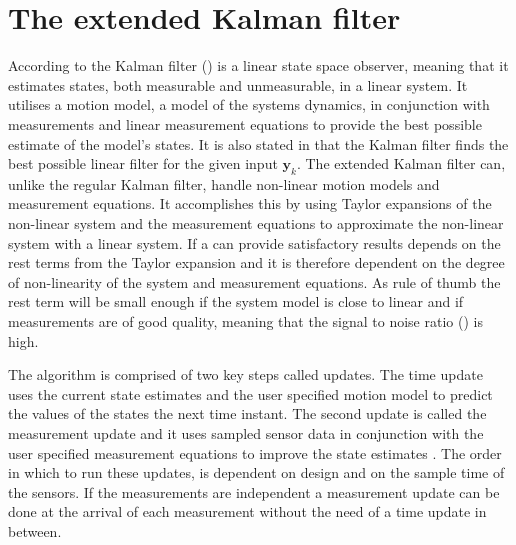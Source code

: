 \section{The extended Kalman filter}
According to \citet{sensorfusion} the Kalman filter (\abbrKF) is a linear state space observer, meaning that it estimates states, both measurable and unmeasurable, in a linear system. It utilises a motion model, a model of the systems dynamics, in conjunction with measurements and linear measurement equations to provide the best possible estimate of the model's states. It is also stated in \citet{sensorfusion} that the Kalman filter finds the best possible linear filter for the given input $\boldsymbol{y}_{k}$. The extended Kalman filter can, unlike the regular Kalman filter, handle non-linear motion models and measurement equations. It accomplishes this by using Taylor expansions of the non-linear system and the measurement equations to approximate the non-linear system with a linear system. If a \abbrEKF can provide satisfactory results depends on the rest terms from the Taylor expansion and it is therefore dependent on the degree of non-linearity of the system and measurement equations\citep{sensorfusion}. As rule of thumb the rest term will be small enough if the system model is close to linear and if measurements are of good quality, meaning that the signal to noise ratio (\abbrSNR) is high\citep{sensorfusion}. 

The \abbrEKF algorithm is comprised of two key steps called updates.
The time update uses the current state estimates and the user specified motion model to predict the values of the states the next time instant. The second update is called the measurement update and it uses sampled sensor data in conjunction with the user specified measurement equations to improve the state estimates \citep{sensorfusion}.
The order in which to run these updates, is dependent on design and on the sample time of the sensors. If the measurements are independent a measurement update can be done at the arrival of each measurement without the need of a time update in between\citep[p.170]{sensorfusion}.

